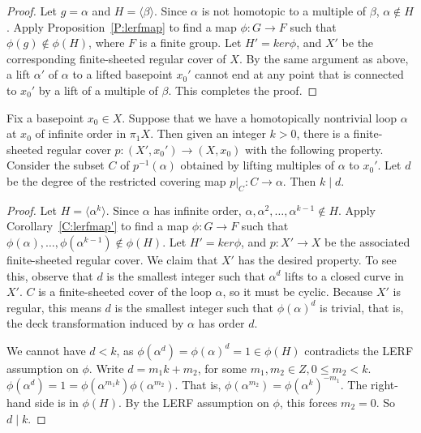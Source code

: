 \begin{proof}

Let $g = \alpha$ and $H = \langle\beta\rangle$. Since $\alpha$ is not homotopic
to a multiple of $\beta$, $\alpha \notin H$. Apply Proposition~\ref{P:lerfmap}
to find a map $\phi \colon G \to F$ such that $\phi(g) \notin \phi(H)$, where
$F$ is a finite group.  Let $H' = ker \phi$, and $X'$ be the corresponding
finite-sheeted regular cover of $X$. By the same argument as above, a lift
$\alpha'$ of $\alpha$ to a lifted basepoint $x_0'$ cannot end at any point that
is connected to $x_0'$ by a lift of a multiple of $\beta$. This completes the
proof.

\end{proof}

\begin{prop}\label{P:lerf3}

Fix a basepoint $x_0 \in X$.  Suppose that we have a homotopically nontrivial
loop $\alpha$ at $x_0$ of infinite order in $\pi_1X$.  Then given an integer
$k>0$, there is a finite-sheeted regular cover $p \colon (X',x_0') \to (X,x_0)$
with the following property.  Consider the subset $C$ of $p^{-1}(\alpha)$
obtained by lifting multiples of $\alpha$ to $x_0'$. Let $d$ be the degree of
the restricted covering map $p|_C \colon C \to \alpha$. Then $k \mid d$.

\end{prop}

\begin{proof}

Let $H = \langle\alpha^k\rangle$. Since $\alpha$ has infinite order,
$\alpha,\alpha^2,\dots,\alpha^{k-1} \notin H$. Apply Corollary~\ref{C:lerfmap'}
to find a map $\phi \colon G \to F$ such that
$\phi(\alpha),\dots,\phi(\alpha^{k-1}) \notin \phi(H)$. Let $H' = ker \phi$,
and $p \colon X' \to X$ be the associated finite-sheeted regular cover.  We
claim that $X'$ has the desired property. To see this, observe that $d$ is the
smallest integer such that $\alpha^d$ lifts to a closed curve in $X'$. $C$ is
a finite-sheeted cover of the loop $\alpha$, so it must be cyclic. Because $X'$
is regular, this means $d$ is the smallest integer such that $\phi(\alpha)^d$
is trivial, that is, the deck transformation induced by $\alpha$ has order $d$.

We cannot have $d<k$, as $\phi(\alpha^d)=\phi(\alpha)^d=1 \in \phi(H)$
contradicts the LERF assumption on $\phi$. Write $d = m_1k + m_2$, for some
$m_1,m_2 \in Z, 0 \leq m_2 < k$.
$\phi(\alpha^d)=1=\phi(\alpha^{m_1k})\phi(\alpha^{m_2})$.  That is,
$\phi(\alpha^{m_2})=\phi(\alpha^k)^{-m_1}$. The right-hand side is in
$\phi(H)$.  By the LERF assumption on $\phi$, this forces $m_2=0$. So $d \mid
k$.

\end{proof}

